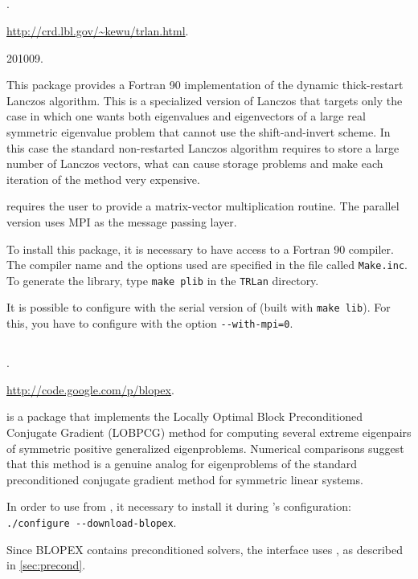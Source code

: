 \subsection*{\underline{\trlan}}
	\begin{description}
	\setlength{\itemsep}{0pt}
	\item[References.]\citep{Wu:2000:TLM}.
	\item[Website.] \url{http://crd.lbl.gov/\~kewu/trlan.html}.
	\item[Version.] 201009.
	\item[Summary.] This package provides a Fortran 90 implementation of the dynamic thick-restart Lanczos algorithm. This is a specialized version of Lanczos that targets only the case in which one wants both eigenvalues and eigenvectors of a large real symmetric eigenvalue problem that cannot use the shift-and-invert scheme. In this case the standard non-restarted Lanczos algorithm requires to store a large number of Lanczos vectors, what can cause storage problems and make each iteration of the method very expensive.

	\trlan{} requires the user to provide a matrix-vector multiplication routine. The parallel version uses MPI as the message passing layer. 
	\item[Installation.] To install this package, it is necessary to have access to a Fortran 90 compiler. The compiler name and the options used are specified in the file called \texttt{Make.inc}. To generate the library, type \texttt{make plib} in the \texttt{TRLan} directory.

	It is possible to configure \slepc with the serial version of \trlan (built with \texttt{make lib}). For this, you have to configure \petsc with the option \texttt{-{}-with-mpi=0}.
	\end{description}

\subsection*{\underline{\blopex}}
	\begin{description}
	\setlength{\itemsep}{0pt}
	\item[References.]\citep{Knyazev:2007:BLO}.
	\item[Website.] \url{http://code.google.com/p/blopex}.
	\item[Summary.] \blopex is a package that implements the Locally Optimal Block Preconditioned Conjugate Gradient (LOBPCG) method for computing several extreme eigenpairs of symmetric positive generalized eigenproblems. Numerical comparisons suggest that this method is a genuine analog for eigenproblems of the standard preconditioned conjugate gradient method for symmetric linear systems.
	\item[Installation.] In order to use \blopex from \slepc, it necessary to install it during \slepc's configuration: \Verb!./configure --download-blopex!.
	\item[Specific options.] Since BLOPEX contains preconditioned solvers, the \slepc interface uses , as described in \ref{sec:precond}.
	\end{description}

